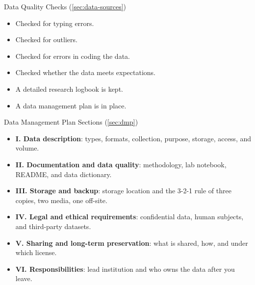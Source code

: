 \documentclass[../main.tex]{subfiles}
\begin{document}
\begin{checklistbox}{Data Quality Checks \quad (\autoref{sec:data-sources})}
\begin{itemize}[leftmargin=2em]
  \item[\(\square\)] Checked for typing errors.
  \item[\(\square\)] Checked for outliers.
  \item[\(\square\)] Checked for errors in coding the data.
  \item[\(\square\)] Checked whether the data meets expectations.
  \item[\(\square\)] A detailed research logbook is kept.
  \item[\(\square\)] A data management plan is in place.
\end{itemize}
\end{checklistbox}

\begin{checklistbox}{Data Management Plan Sections \quad (\autoref{sec:dmp})}
\begin{itemize}[leftmargin=2em]
  \item[\(\square\)] \textbf{I. Data description}: types, formats, collection, purpose, storage, access, and volume.
  \item[\(\square\)] \textbf{II. Documentation and data quality}: methodology, lab notebook, README, and data dictionary.
  \item[\(\square\)] \textbf{III. Storage and backup}: storage location and the 3-2-1 rule of three copies, two media, one off-site.
  \item[\(\square\)] \textbf{IV. Legal and ethical requirements}: confidential data, human subjects, and third-party datasets.
  \item[\(\square\)] \textbf{V. Sharing and long-term preservation}: what is shared, how, and under which license.
  \item[\(\square\)] \textbf{VI. Responsibilities}: lead institution and who owns the data after you leave.
\end{itemize}
\end{checklistbox}
\end{document}
